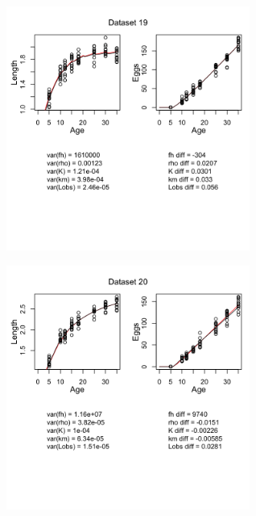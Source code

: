 \documentclass[12pt,reqno,final,pdftex]{amsart}\usepackage[]{graphicx}\usepackage[]{color}
\newenvironment{knitrout}{}{} %
\theoremstyle{plain}
\numberwithin{equation}{part}
\begin{document}
\begin{knitrout}
\includegraphics[width=0.6\textwidth]{figure/unnamed-chunk-5-19} \hfill{}




\includegraphics[width=0.6\textwidth]{figure/unnamed-chunk-5-20} \hfill{}



\end{knitrout}

\clearpage
\end{document}
